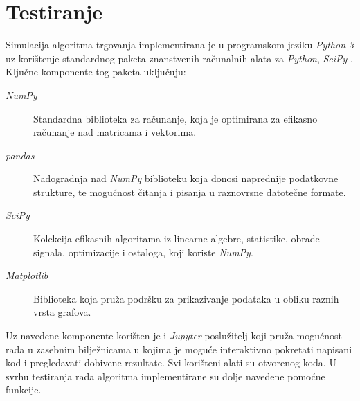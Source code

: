 \documentclass[lmodern, utf8, diplomski, numeric]{fer}
\begin{document}
  \section{Testiranje}
  Simulacija algoritma trgovanja implementirana je u programskom jeziku \textit{Python 3} uz korištenje standardnog paketa znanstvenih računalnih alata za \textit{Python}, \textit{SciPy} \citep{scipy}.
  Ključne komponente tog paketa uključuju:
  \begin{description}
    \item[\textit{NumPy}] Standardna biblioteka za računanje, koja je optimirana za efikasno računanje nad matricama i vektorima.
    \item[\textit{pandas}] Nadogradnja nad \textit{NumPy} biblioteku koja donosi naprednije podatkovne strukture, te mogućnost čitanja i pisanja u raznovrsne datotečne formate.
    \item[\textit{SciPy}] Kolekcija efikasnih algoritama iz linearne algebre, statistike, obrade signala, optimizacije i ostaloga, koji koriste \textit{NumPy}.
    \item[\textit{Matplotlib}] Biblioteka koja pruža podršku za prikazivanje podataka u obliku raznih vrsta grafova.
  \end{description}
  Uz navedene komponente korišten je i \textit{Jupyter} poslužitelj koji pruža mogućnost rada u zasebnim bilježnicama u kojima je moguće interaktivno pokretati napisani kod i pregledavati dobivene rezultate.
  Svi korišteni alati su otvorenog koda.
  U svrhu testiranja rada algoritma implementirane su dolje navedene pomoćne funkcije.
\end{document}
